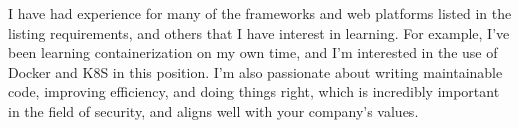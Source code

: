 \documentclass[11pt, letter]{awesome-cv}
\begin{document}
\begin{cvletter}
I have had experience for many of the frameworks and web platforms listed in the listing requirements,
and others that I have interest in learning.
For example, I've been learning containerization on my own time, and 
I'm interested in the use of Docker and K8S in this position.
I'm also passionate about writing maintainable code, improving efficiency, and doing things right,
which is incredibly important in the field of security, and aligns well with your company's values.

\end{cvletter}
\end{document}
